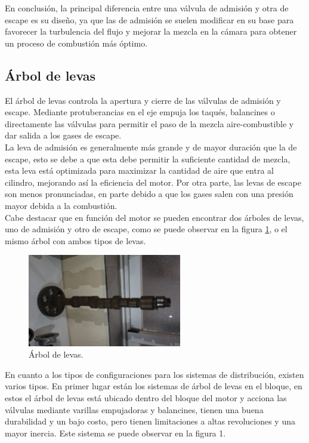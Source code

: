 En conclusión, la principal diferencia entre una válvula de admisión y otra de escape es su diseño, ya que las de admisión se suelen modificar en su base para favorecer la turbulencia del flujo y mejorar la mezcla en la cámara para obtener un proceso de combustión más óptimo.


\subsection{Árbol de levas} \label{ss:camshaft}

El árbol de levas controla la apertura y cierre de las válvulas de admisión y escape. Mediante protuberancias en el eje empuja los taqués, balancines o directamente las válvulas para permitir el paso de la mezcla aire-combustible y dar salida a los gases de escape.\\

La leva de admisión es generalmente más grande y de mayor duración que la de escape, esto se debe a que esta debe permitir la suficiente cantidad de mezcla, esta leva está optimizada para maximizar la cantidad de aire que entra al cilindro, mejorando así la eficiencia del motor. Por otra parte, las levas de escape son menos pronunciadas, en parte debido a que los gases salen con una presión mayor debida a la combustión.\\

Cabe destacar que en función del motor se pueden encontrar dos árboles de levas, uno de admisión y otro de escape, como se puede observar en la figura \ref{fig:dohc}, o el mismo árbol con ambos tipos de levas.

\begin{figure}[H]
	\centering
	\includegraphics[width=0.6\textwidth]{Figures/01/m2/camshaft.jpg}
	\caption{Árbol de levas.}
	\label{fig:dohc}
\end{figure}

En cuanto a los tipos de configuraciones para los sistemas de distribución, existen varios tipos. En primer lugar están los sistemas de árbol de levas en el bloque, en estos el árbol de levas está ubicado dentro del bloque del motor y acciona las válvulas mediante varillas empujadoras y balancines, tienen una buena durabilidad y un bajo costo, pero tienen limitaciones a altas revoluciones y una mayor inercia. Este sistema se puede observar en la figura 1.\\

